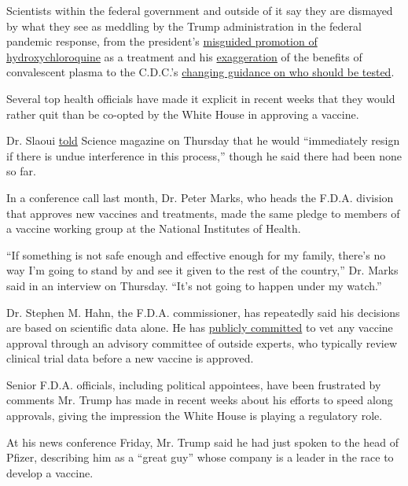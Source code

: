 Scientists within the federal government and outside of it say they are
dismayed by what they see as meddling by the Trump administration in the
federal pandemic response, from the president's
\href{https://www.nytimes3xbfgragh.onion/2020/06/15/health/fda-hydroxychloroquine-malaria.html}{misguided
promotion of hydroxychloroquine} as a treatment and his
\href{https://www.nytimes3xbfgragh.onion/2020/08/23/us/politics/fda-plasma-coronavirus.html}{exaggeration}
of the benefits of convalescent plasma to the C.D.C.'s
\href{https://www.nytimes3xbfgragh.onion/2020/08/26/us/politics/coronavirus-testing-trump-cdc.html}{changing
guidance on who should be tested}.

Several top health officials have made it explicit in recent weeks that
they would rather quit than be co-opted by the White House in approving
a vaccine.

Dr. Slaoui
\href{https://www.sciencemag.org/news/2020/09/leader-us-vaccine-push-says-he-ll-quit-if-politics-trumps-science-approval-process}{told}
Science magazine on Thursday that he would ``immediately resign if there
is undue interference in this process,'' though he said there had been
none so far.

In a conference call last month, Dr. Peter Marks, who heads the F.D.A.
division that approves new vaccines and treatments, made the same pledge
to members of a vaccine working group at the National Institutes of
Health.

``If something is not safe enough and effective enough for my family,
there's no way I'm going to stand by and see it given to the rest of the
country,'' Dr. Marks said in an interview on Thursday. ``It's not going
to happen under my watch.''

Dr. Stephen M. Hahn, the F.D.A. commissioner, has repeatedly said his
decisions are based on scientific data alone. He has
\href{https://www.healthaffairs.org/do/10.1377/hblog20200814.996612/full/}{publicly
committed} to vet any vaccine approval through an advisory committee of
outside experts, who typically review clinical trial data before a new
vaccine is approved.

Senior F.D.A. officials, including political appointees, have been
frustrated by comments Mr. Trump has made in recent weeks about his
efforts to speed along approvals, giving the impression the White House
is playing a regulatory role.

At his news conference Friday, Mr. Trump said he had just spoken to the
head of Pfizer, describing him as a ``great guy'' whose company is a
leader in the race to develop a vaccine.

